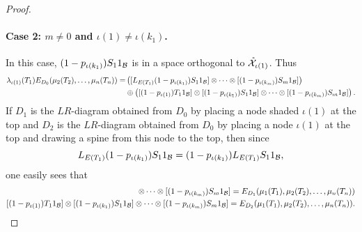 \begin{proof}
			\paragraph{Case 2: $m \neq 0$ and $\iota(1) \neq \iota(k_1)$.}
			In this case, $(1-p_{\iota(k_{1})}) S_1 1_{\mathcal{B}}$ is in a space orthogonal to $\mathring{\mathcal{X}}_{\iota(1)}$.
			Thus
			\begin{align*}
				\lambda_{\iota(1)}(T_1)E_{D_0}(\mu_2(T_2),\ldots, \mu_n(T_n))
				=& \left([L_{E(T_1)}(1-p_{\iota(k_{1})}) S_1 1_{\mathcal{B}}] \otimes \cdots \otimes [(1-p_{\iota(k_{m})}) S_m1_{\mathcal{B}}]\right) \\
				&
				\oplus \left([(1-p_{\iota(1)})T_1 1_{\mathcal{B}}]
				\otimes [(1-p_{\iota(k_{1})}) S_1 1_{\mathcal{B}}] \otimes \cdots \otimes [(1-p_{\iota(k_{m})}) S_m1_{\mathcal{B}}]\right).
			\end{align*}
			If $D_1$ is the $LR$-diagram obtained from $D_0$ by placing a node shaded $\iota(1)$ at the top and $D_2$ is the $LR$-diagram obtained from $D_0$ by placing a node $\iota(1)$ at the top and drawing a spine from this node to the top, then since 
			\[
				L_{E(T_1)}(1-p_{\iota(k_{1})}) S_1 1_{\mathcal{B}} = (1-p_{\iota(k_{1})}) L_{E(T_1)}S_1 1_{\mathcal{B}},
			\]
			one easily sees that 
			\begin{align*}
				[L_{E(T_1)}(1-p_{\iota(k_{1})}) S_1 1_\cB] \otimes \cdots \otimes [(1-p_{\iota(k_{m})}) S_m1_\cB] = E_{D_1}(\mu_1(T_1), \mu_2(T_2),\ldots, \mu_n(T_n)) \\
				[(1-p_{\iota(1)})T_1 1_\cB]
				\otimes [(1-p_{\iota(k_{1})}) S_1 1_\cB] \otimes \cdots \otimes [(1-p_{\iota(k_{m})}) S_m1_\cB] = E_{D_2}(\mu_1(T_1), \mu_2(T_2),\ldots, \mu_n(T_n)).
			\end{align*}









\end{proof}
